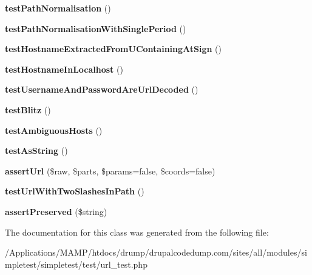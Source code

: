 \begin{DoxyCompactItemize}
\item 
\hypertarget{class_test_of_url_aa3869c5f6d092031f264fb80cb5e89c7}{
{\bfseries testPathNormalisation} ()}
\label{class_test_of_url_aa3869c5f6d092031f264fb80cb5e89c7}

\item 
\hypertarget{class_test_of_url_a850636c99b70e306edc2d599c004d0a3}{
{\bfseries testPathNormalisationWithSinglePeriod} ()}
\label{class_test_of_url_a850636c99b70e306edc2d599c004d0a3}

\item 
\hypertarget{class_test_of_url_accc5fe76e8c9b6273761b3e1dac894bd}{
{\bfseries testHostnameExtractedFromUContainingAtSign} ()}
\label{class_test_of_url_accc5fe76e8c9b6273761b3e1dac894bd}

\item 
\hypertarget{class_test_of_url_ab630277eada781da4c707776a64401f3}{
{\bfseries testHostnameInLocalhost} ()}
\label{class_test_of_url_ab630277eada781da4c707776a64401f3}

\item 
\hypertarget{class_test_of_url_a7abfb202c7d72e399887085da37c4470}{
{\bfseries testUsernameAndPasswordAreUrlDecoded} ()}
\label{class_test_of_url_a7abfb202c7d72e399887085da37c4470}

\item 
\hypertarget{class_test_of_url_a5b8af653066b13f5c3ebaac586c1bf66}{
{\bfseries testBlitz} ()}
\label{class_test_of_url_a5b8af653066b13f5c3ebaac586c1bf66}

\item 
\hypertarget{class_test_of_url_adb8e93940ef9ac78d677f44f729f2293}{
{\bfseries testAmbiguousHosts} ()}
\label{class_test_of_url_adb8e93940ef9ac78d677f44f729f2293}

\item 
\hypertarget{class_test_of_url_a91436b9efeabfd2954cd52ec08649973}{
{\bfseries testAsString} ()}
\label{class_test_of_url_a91436b9efeabfd2954cd52ec08649973}

\item 
\hypertarget{class_test_of_url_a02cdbbd86f02a7ae21ead43dfc0f0c47}{
{\bfseries assertUrl} (\$raw, \$parts, \$params=false, \$coords=false)}
\label{class_test_of_url_a02cdbbd86f02a7ae21ead43dfc0f0c47}

\item 
\hypertarget{class_test_of_url_a27cf2f68f0be6d6fd36cc109e187a318}{
{\bfseries testUrlWithTwoSlashesInPath} ()}
\label{class_test_of_url_a27cf2f68f0be6d6fd36cc109e187a318}

\item 
\hypertarget{class_test_of_url_a963bab2b7a6c30be9771f25c7ad7ed90}{
{\bfseries assertPreserved} (\$string)}
\label{class_test_of_url_a963bab2b7a6c30be9771f25c7ad7ed90}

\end{DoxyCompactItemize}


The documentation for this class was generated from the following file:\begin{DoxyCompactItemize}
\item 
/Applications/MAMP/htdocs/drump/drupalcodedump.com/sites/all/modules/simpletest/simpletest/test/url\_\-test.php\end{DoxyCompactItemize}
